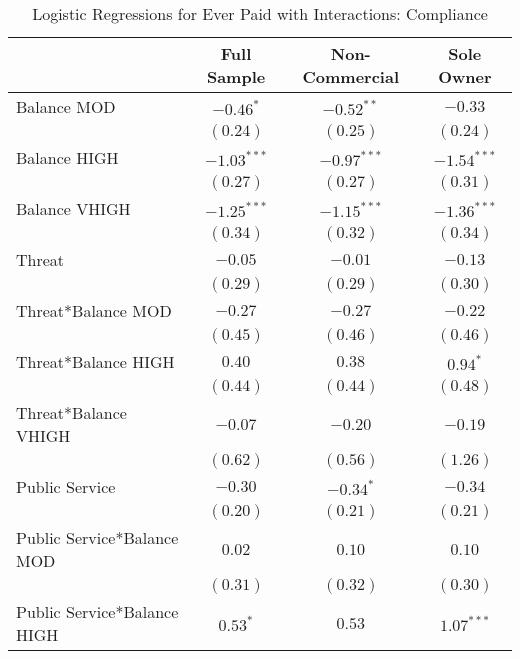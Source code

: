 \documentclass[12pt,titlepage]{article}
\begin{document}
\begin{table}[htbp]
\caption{Logistic Regressions for Ever Paid with Interactions: Compliance}
\begin{center}
\begin{tabular}{|l|c|c|c|}
\hline
                             & Full Sample & Non-Commercial & Sole Owner \\
\hline
Balance MOD                  & $-0.46^{*}$   & $-0.52^{**}$  & $-0.33$       \\
                             & $(0.24)$      & $(0.25)$      & $(0.24)$      \\
Balance HIGH                 & $-1.03^{***}$ & $-0.97^{***}$ & $-1.54^{***}$ \\
                             & $(0.27)$      & $(0.27)$      & $(0.31)$      \\
Balance VHIGH                & $-1.25^{***}$ & $-1.15^{***}$ & $-1.36^{***}$ \\
                             & $(0.34)$      & $(0.32)$      & $(0.34)$      \\
Threat                       & $-0.05$       & $-0.01$       & $-0.13$       \\
                             & $(0.29)$      & $(0.29)$      & $(0.30)$      \\
Threat*Balance MOD           & $-0.27$       & $-0.27$       & $-0.22$       \\
                             & $(0.45)$      & $(0.46)$      & $(0.46)$      \\
Threat*Balance HIGH          & $0.40$        & $0.38$        & $0.94^{*}$    \\
                             & $(0.44)$      & $(0.44)$      & $(0.48)$      \\
Threat*Balance VHIGH         & $-0.07$       & $-0.20$       & $-0.19$       \\
                             & $(0.62)$      & $(0.56)$      & $(1.26)$      \\
Public Service               & $-0.30$       & $-0.34^{*}$   & $-0.34$       \\
                             & $(0.20)$      & $(0.21)$      & $(0.21)$      \\
Public Service*Balance MOD   & $0.02$        & $0.10$        & $0.10$        \\
                             & $(0.31)$      & $(0.32)$      & $(0.30)$      \\
Public Service*Balance HIGH  & $0.53^{*}$    & $0.53$        & $1.07^{***}$  \\

\end{tabular}
\end{center}
\end{table}
\end{document}
